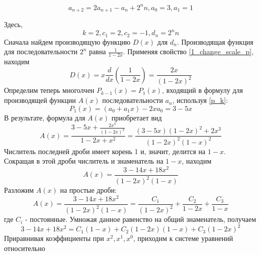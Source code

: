 \begin{task}
    \begin{equation*}
        a_{n+2} = 2a_{n+1} - a_n + 2^n n, a_0 = 3, a_1 = 1
    \end{equation*}
    \begin{solution}
        Здесь,
        \begin{equation*}
            k = 2, c_1 = 2, c_2 = -1, d_n = 2^n n
        \end{equation*}
        Сначала найдем производящую функцию $D(x)$ для $d_n$. 
        Производящая функция для последовательности $2^n$ равна $\frac{1}{1-2x}$. 
        Применяя свойство \ref{1_change_scale_p}, находим 
        \begin{equation*}
            D(x) = x \frac{d}{dx} \left(\frac{1}{1 - 2x}\right) = \frac{2x}{(1 - 2x)^2}
        \end{equation*}
        Определим теперь многолчен $P_{k-1}(x) = P_1(x)$, входящий в формулу для производящей функции
        $A(x)$ последовательности $a_n$, используя \ref{p_k}:
        \begin{equation*}
            P_1(x) = (a_0 + a_1x) - 2xa_0 = 3 - 5x
        \end{equation*}
        В результате, формула для $A(x)$ приобретает вид 
        \begin{equation*}
            A(x) = \frac{3 - 5x + \frac{2x^3}{(1-2x)^2}}{1 - 2x + x^2} = 
            \frac{(3 - 5x)(1 - 2x)^2 + 2x^3}{(1 - 2x)^2 (1 - x)^2}
        \end{equation*}
        Числитель последней дроби имеет корень 1 и, значит, делится на $1 - x$. Сокращая в этой дроби
        числитель и знаменатель на $1 - x$, находим
        \begin{equation*}
            A(x) = \frac{3 - 14x + 18x^2}{(1 - 2x)^2(1 - x)}
        \end{equation*}
        Разложим $A(x)$ на простые дроби:
        \begin{equation*}
            A(x) = \frac{3 - 14x + 18x^2}{(1 - 2x)^2 (1 - x)} = 
            \frac{C_1}{(1 - 2x)^2} + \frac{C_2}{1 - 2x} + \frac{C_3}{1 - x} 
        \end{equation*}
        где $C_i$ - постоянные. Умножая данное равенство на общий знаменатель, получаем
        \begin{equation*}
            3 - 14x + 18x^2 = C_1(1 - x) + C_2(1 - 2x)(1 - x) + C_3(1 - 2x)^2
        \end{equation*}
        Приравнивая коэффициенты при $x^2, x^1, x^0$, приходим к системе уравнений относительно

\end{solution}
\end{task}
